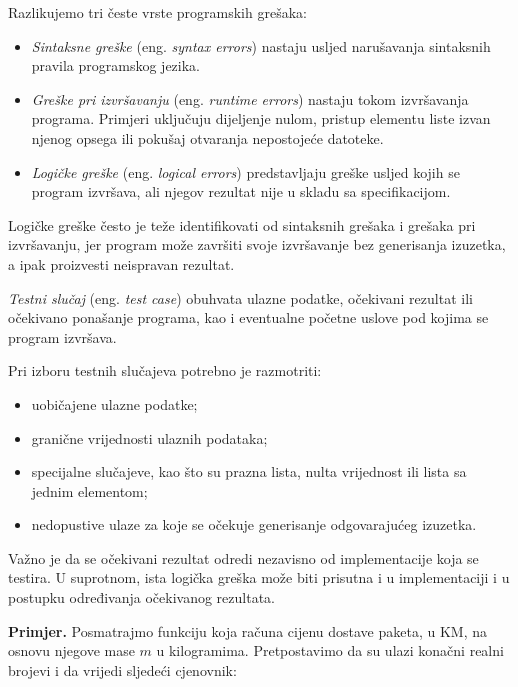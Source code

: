 Razlikujemo tri česte vrste programskih grešaka:

\begin{itemize}
	\item \textit{Sintaksne greške} (eng. \emph{syntax errors}) 
	nastaju usljed narušavanja sintaksnih pravila programskog 
	jezika.
	
	\item \textit{Greške pri izvršavanju} (eng. 
	\emph{runtime errors}) nastaju tokom izvršavanja 
	programa. Primjeri uključuju dijeljenje nulom, pristup 
	elementu liste izvan njenog opsega ili pokušaj 
	otvaranja nepostojeće datoteke.
	
	\item \textit{Logičke greške} (eng. \emph{logical errors}) 
	predstavljaju greške usljed kojih se program izvršava, 
	ali njegov rezultat nije u skladu sa specifikacijom.
\end{itemize}

Logičke greške često je teže identifikovati od sintaksnih 
grešaka i grešaka pri izvršavanju, jer program može završiti 
svoje izvršavanje bez generisanja izuzetka, a ipak proizvesti 
neispravan rezultat.

\textit{Testni slučaj} (eng. \emph{test case}) obuhvata 
ulazne podatke, očekivani rezultat ili očekivano ponašanje 
programa, kao i eventualne početne uslove pod kojima se 
program izvršava.

Pri izboru testnih slučajeva potrebno je razmotriti:

\begin{itemize}
	\item uobičajene ulazne podatke;
	\item granične vrijednosti ulaznih podataka;
	\item specijalne slučajeve, kao što su prazna lista, 
	nulta vrijednost ili lista sa jednim elementom;
	\item nedopustive ulaze za koje se očekuje generisanje 
	odgovarajućeg izuzetka.
\end{itemize}

Važno je da se očekivani rezultat odredi nezavisno od 
implementacije koja se testira. U suprotnom, ista logička 
greška može biti prisutna i u implementaciji i u postupku 
određivanja očekivanog rezultata.

\textbf{Primjer.} Posmatrajmo funkciju koja računa cijenu 
dostave paketa, u KM, na osnovu njegove mase $m$ u 
kilogramima. Pretpostavimo da su ulazi konačni realni 
brojevi i da vrijedi sljedeći cjenovnik:

